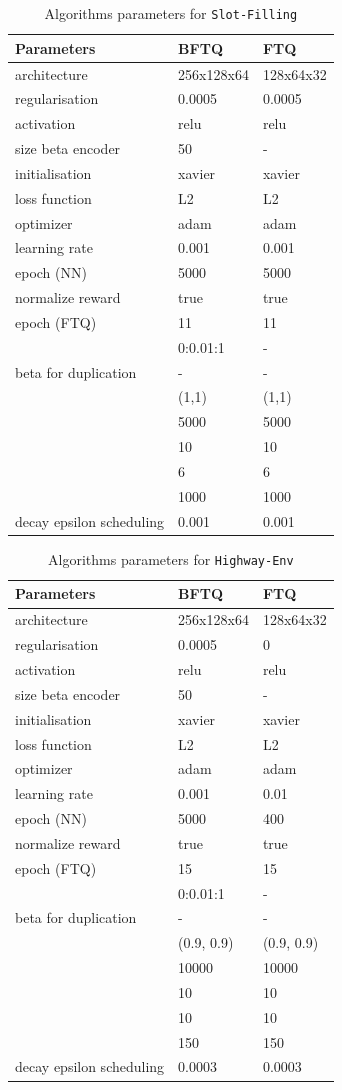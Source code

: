 \begin{table}[H]
    \centering
    \begin{tabularx}{1.0\textwidth}{lll}
        \toprule
        Parameters & BFTQ & FTQ\tabularnewline
        \midrule
        architecture & 256x128x64 & 128x64x32\tabularnewline
        regularisation & 0.0005 & 0.0005\tabularnewline
        activation & relu & relu\tabularnewline
        size beta encoder & 50 & -\tabularnewline
        initialisation & xavier & xavier\tabularnewline
        loss function & L2 & L2\tabularnewline
        optimizer & adam & adam\tabularnewline
        learning rate & 0.001 & 0.001\tabularnewline
        epoch (NN) & 5000 & 5000\tabularnewline
        normalize reward & true & true\tabularnewline
        epoch (FTQ) & 11 & 11\tabularnewline
        & 0:0.01:1 & -\tabularnewline
        beta for duplication & - & -\tabularnewline
        & (1,1) & (1,1)\tabularnewline
        & 5000 & 5000\tabularnewline
        & 10 & 10\tabularnewline
        & 6 & 6\tabularnewline
        & 1000 & 1000\tabularnewline
        decay epsilon scheduling & 0.001 & 0.001\tabularnewline
        \bottomrule
    \end{tabularx}
    \caption{Algorithms parameters for \texttt{Slot-Filling}}
\end{table}
%
\begin{table}[H]
    \centering
    \begin{tabularx}{1.0\textwidth}{lll}
        \toprule
        Parameters & BFTQ & FTQ\tabularnewline
        \midrule
        architecture & 256x128x64 & 128x64x32\tabularnewline
        regularisation & 0.0005 & 0\tabularnewline
        activation & relu & relu\tabularnewline
        size beta encoder & 50 & -\tabularnewline
        initialisation & xavier & xavier\tabularnewline
        loss function & L2 & L2\tabularnewline
        optimizer & adam & adam\tabularnewline
        learning rate & 0.001 & 0.01\tabularnewline
        epoch (NN) & 5000 & 400\tabularnewline
        normalize reward & true & true\tabularnewline
        epoch (FTQ) & 15 & 15\tabularnewline
        & 0:0.01:1 & -\tabularnewline
        beta for duplication & - & -\tabularnewline
        & (0.9, 0.9) & (0.9, 0.9)\tabularnewline
        & 10000 & 10000\tabularnewline
        & 10 & 10\tabularnewline
        & 10 & 10\tabularnewline
        & 150 & 150\tabularnewline
        decay epsilon scheduling & 0.0003 & 0.0003\tabularnewline
        \bottomrule
    \end{tabularx}
    \caption{Algorithms parameters for \texttt{Highway-Env}}
\end{table}


